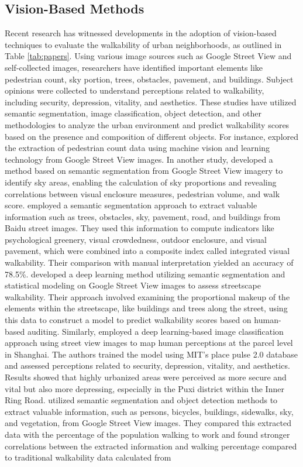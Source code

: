 \documentclass[11pt]{article}
\begin{document}
\subsection{Vision-Based Methods}


Recent research has witnessed developments in the adoption of vision-based techniques to evaluate the walkability of urban neighborhoods, as outlined in Table \ref{tab:papers}. Using various image sources such as Google Street View and self-collected images, researchers have identified important elements like pedestrian count, sky portion, trees, obstacles, pavement, and buildings. Subject opinions were collected to understand perceptions related to walkability, including security, depression, vitality, and aesthetics. These studies have utilized semantic segmentation, image classification, object detection, and other methodologies to analyze the urban environment and predict walkability scores based on the presence and composition of different objects. For instance, \citet{yin2015big} explored the extraction of pedestrian count data using machine vision and learning technology from Google Street View images. In another study, \citet{yin2016measuring} developed a method based on semantic segmentation from Google Street View imagery to identify sky areas, enabling the calculation of sky proportions and revealing correlations between visual enclosure measures, pedestrian volume, and walk score. \citet{zhou2019social} employed a semantic segmentation approach to extract valuable information such as trees, obstacles, sky, pavement, road, and buildings from Baidu street images. They used this information to compute indicators like psychological greenery, visual crowdedness, outdoor enclosure, and visual pavement, which were combined into a composite index called integrated visual walkability. Their comparison with manual interpretation yielded an accuracy of 78.5\%. \citet{nagata2020objective}  developed a deep learning method utilizing semantic segmentation and statistical modeling on Google Street View images to assess streetscape walkability. Their approach involved examining the proportional makeup of the elements within the streetscape, like buildings and trees along the street, using this data to construct a model to predict walkability scores based on human-based auditing. Similarly, \citet{wei2022mapping} employed a deep learning-based image classification approach using street view images to map human perceptions at the parcel level in Shanghai. The authors trained the model using MIT's place pulse 2.0 database and assessed perceptions related to security, depression, vitality, and aesthetics. Results showed that highly urbanized areas were perceived as more secure and vital but also more depressing, especially in the Puxi district within the Inner Ring Road. \citet{doiron2022predicting} utilized semantic segmentation and object detection methods to extract valuable information, such as persons, bicycles, buildings, sidewalks, sky, and vegetation, from Google Street View images. They compared this extracted data with the percentage of the population walking to work and found stronger correlations between the extracted information and walking percentage compared to traditional walkability data calculated from 
\end{document}
